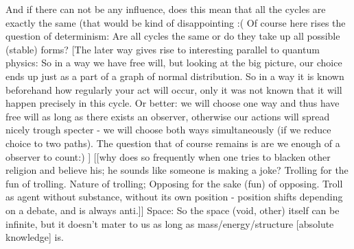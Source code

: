 \documentclass[10pt]{book}
\begin{document}
And if there can not be any influence, does this mean that all the cycles are exactly the same (that would be kind of disappointing :( Of course here rises the question of determinism: Are all cycles the same or do they take up all possible (stable) forms? [The later way gives rise to interesting parallel to quantum physics: So in a way we have free will, but looking at the big picture, our choice ends up just as a part of a graph of normal distribution. So in a way it is known beforehand how regularly your act will occur, only it was not known that it will happen precisely in this cycle. Or better: we will choose one way and thus have free will as long as there exists an observer, otherwise our actions will spread nicely trough specter - we will choose both ways simultaneously (if we reduce choice to two paths). The question that of course remains is are we enough of a observer to count:) ]
[[why does so frequently when one tries to blacken other religion and believe his; he sounds like someone is making a joke? Trolling for the fun of trolling. Nature of trolling; Opposing for the sake (fun) of opposing. Troll as agent without substance, without its own position - position shifts depending on a debate, and is always anti.]]
Space:
So the space (void, other) itself can be infinite, but it doesn't mater to us as long as mass/energy/structure [absolute knowledge] is. 
\end{document}
